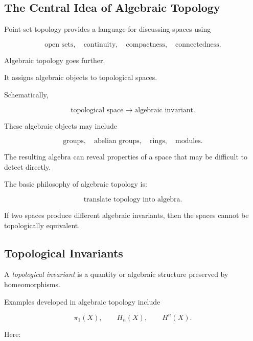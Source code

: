 \subsection{The Central Idea of Algebraic Topology}
\label{subsec:central-idea-algebraic-topology}

Point-set topology provides a language for discussing spaces using

\[
\boxed{
\text{open sets},
\quad
\text{continuity},
\quad
\text{compactness},
\quad
\text{connectedness}.
}
\]

Algebraic topology goes further.

It assigns algebraic objects to topological spaces.

Schematically,

\[
\boxed{
\text{topological space}
\longrightarrow
\text{algebraic invariant}.
}
\]

These algebraic objects may include

\[
\boxed{
\text{groups},
\quad
\text{abelian groups},
\quad
\text{rings},
\quad
\text{modules}.
}
\]

The resulting algebra can reveal properties of a space that may be difficult
to detect directly.

\begin{conceptbox}
The basic philosophy of algebraic topology is:

\[
\boxed{
\text{translate topology into algebra}.
}
\]

If two spaces produce different algebraic invariants, then the spaces cannot
be topologically equivalent.
\end{conceptbox}

\subsection{Topological Invariants}
\label{subsec:algebraic-topological-invariants}

A \emph{topological invariant} is a quantity or algebraic structure preserved
by homeomorphisms.

Examples developed in algebraic topology include

\[
\boxed{
\pi_1(X),
\qquad
H_n(X),
\qquad
H^n(X).
}
\]

Here:

